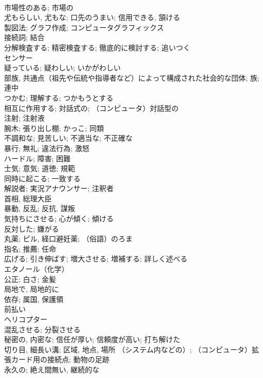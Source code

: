 \documentclass[8pt]{extreport}
\begin{document}
\begin{CJK}{UTF8}{min}
\\	市場性のある; 市場の	
\\	尤もらしい, 尤もな; 口先のうまい; 信用できる, 頷ける	
\\	製図法; グラフ作成; コンピュータグラフィックス	
\\	接続詞; 結合	
\\	分解検査する; 精密検査する; 徹底的に検討する; 追いつく	
\\	センサー	
\\	疑っている; 疑わしい; いかがわしい	
\\	部族, 共通点（祖先や伝統や指導者など）によって構成された社会的な団体; 族; 連中	
\\	つかむ; 理解する; つかもうとする	
\\	相互に作用する; 対話式の; （コンピュータ）対話型の	
\\	注射; 注射液	
\\	腕木; 張り出し棚; かっこ; 同類	
\\	不調和な; 見苦しい; 不適当な; 不正確な	
\\	暴行; 無礼; 違法行為; 激怒	
\\	ハードル; 障害; 困難	
\\	士気; 意気; 道徳; 規範	
\\	同時に起こる; 一致する	
\\	解説者; 実況アナウンサー; 注釈者
\\	首相, 総理大臣	
\\	暴動, 反乱; 反抗, 謀叛	
\\	気持ちにさせる; 心が傾く; 傾ける	
\\	反対した; 嫌がる	
\\	丸薬; ピル, 経口避妊薬; （俗語）のろま	
\\	指名; 推薦; 任命	
\\	広げる; 引き伸ばす; 増大させる; 増補する; 詳しく述べる	
\\	エタノール（化学）	
\\	公正; 白さ; 金髪	
\\	局地で, 局地的に	
\\	依存; 属国, 保護領	
\\	前払い	
\\	ヘリコプター	
\\	混乱させる; 分裂させる	
\\	秘密の, 内密な; 信任が厚い; 信頼度が高い; 打ち解けた	
\\	切り目, 細長い溝; 区域, 地点, 場所 （システム内などの）; （コンピュータ）拡張カード用の接続点; 動物の足跡	
\\	永久の; 絶え間無い, 継続的な	

\end{CJK}
\end{document}
